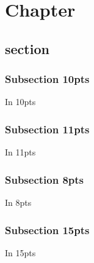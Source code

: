 \documentclass{book}
\newcommand{\Texinfothechapterheading}{}
\newcommand{\Texinfoheadingchaptername}{\chaptername}
\newcommand{\Texinfochapter}[1]{\chapter{#1}
\renewcommand{\Texinfothechapterheading}{\Texinfoheadingchaptername{} \thechapter{} }%
}%
\renewcommand{\_}{\Texinfounderscore\discretionary{}{}{}}
\begin{document}
\label{anchor:Top}%
\Texinfochapter{{Chapter}}
\label{anchor:chapter}%

\section{{section}}
\label{anchor:section}%

\subsection{{Subsection 10pts}}
\label{anchor:Subsection-10pts}%
In 10pts

\subsection{{Subsection 11pts}}
\label{anchor:Subsection-11pts}%

In 11pts

\subsection{{Subsection 8pts}}
\label{anchor:Subsection-8pts}%

In 8pts

\subsection{{Subsection 15pts}}
\label{anchor:Subsection-15pts}%

In 15pts
\end{document}
